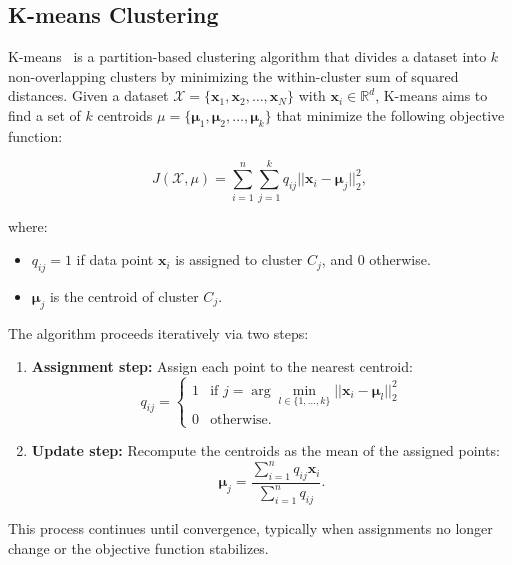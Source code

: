 \subsection*{K-means Clustering}
K-means~\cite{k_means} is a partition-based clustering algorithm that divides a
dataset into $k$ non-overlapping clusters by minimizing the within-cluster sum
of squared distances. Given a dataset $\mathcal{X} = \{\mathbf{x}_1,
    \mathbf{x}_2, \ldots, \mathbf{x}_N\}$ with $\mathbf{x}_i \in \mathbb{R}^d$,
K-means aims to find a set of $k$ centroids $\mu = \{\boldsymbol{\mu}_1,
    \boldsymbol{\mu}_2, \ldots, \boldsymbol{\mu}_k\}$ that minimize the following
objective function:

\begin{equation}
    J(\mathcal{X}, \mu) = \sum_{i=1}^{n} \sum_{j=1}^{k} q_{ij} || \mathbf{x}_i - \boldsymbol{\mu}_j ||_2^2,
\end{equation}

where:
\begin{itemize}
    \item $q_{ij} = 1$ if data point $\mathbf{x}_i$ is assigned to cluster $C_j$, and $0$ otherwise.
    \item $\boldsymbol{\mu}_j$ is the centroid of cluster $C_j$.
\end{itemize}

The algorithm proceeds iteratively via two steps:
\begin{enumerate}
    \item \textbf{Assignment step:} Assign each point to the nearest centroid:
          \begin{equation}
              q_{ij} =
              \begin{cases}
                  1 & \text{if } j = \arg \min_{l \in \{1, \ldots, k\}} ||\mathbf{x}_i - \boldsymbol{\mu}_l||_2^2 \\
                  0 & \text{otherwise}.
              \end{cases}
          \end{equation}
    \item \textbf{Update step:} Recompute the centroids as the mean of the assigned points:
          \begin{equation}
              \boldsymbol{\mu}_j = \frac{\sum_{i=1}^{n} q_{ij} \mathbf{x}_i}{\sum_{i=1}^{n} q_{ij}}.
          \end{equation}
\end{enumerate}

This process continues until convergence, typically when assignments no longer
change or the objective function stabilizes.

